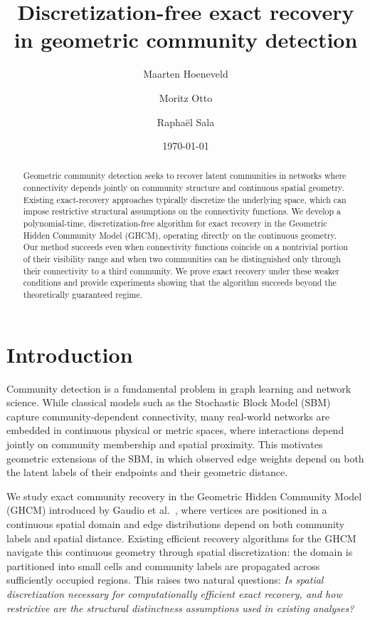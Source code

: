 \documentclass[11pt, a4paper]{amsart}
\title{Discretization-free exact recovery in geometric community detection}
\author{Maarten Hoeneveld}
\author{Moritz Otto}
\author{Raphaël Sala}
\date{\today}
\newcommand{\1}{\mathbf{1}}
\theoremstyle{definition}
\theoremstyle{remark}
\theoremstyle{definition}
\begin{document}
\begin{abstract}
Geometric community detection seeks to recover latent communities in networks where connectivity depends jointly on community structure and continuous spatial geometry. Existing exact-recovery approaches typically discretize the underlying space, which can impose restrictive structural assumptions on the connectivity functions. We develop a polynomial-time, discretization-free algorithm for exact recovery in the Geometric Hidden Community Model (GHCM), operating directly on the continuous geometry. Our method succeeds even when connectivity functions coincide on a nontrivial portion of their visibility range and when two communities can be distinguished only through their connectivity to a third community. We prove exact recovery under these weaker conditions and provide experiments showing that the algorithm succeeds beyond the theoretically guaranteed regime.
\end{abstract}

\maketitle


\section{Introduction}

Community detection is a fundamental problem in graph learning and network
science. While classical models such as the Stochastic Block Model (SBM)
capture community-dependent connectivity, many real-world networks are
embedded in continuous physical or metric spaces, where interactions depend
jointly on community membership and spatial proximity. This motivates
geometric extensions of the SBM, in which observed edge weights depend on
both the latent labels of their endpoints and their geometric distance.

We study exact community recovery in the Geometric Hidden Community Model
(GHCM) introduced by Gaudio et al.~\cite{gaudio2025incguan}, where vertices
are positioned in a continuous spatial domain and edge distributions depend
on both community labels and spatial distance. Existing efficient recovery
algorithms for the GHCM navigate this continuous geometry through spatial
discretization: the domain is partitioned into small cells and community
labels are propagated across sufficiently occupied regions. This raises two
natural questions: \emph{Is spatial discretization necessary for
computationally efficient exact recovery, and how restrictive are the
structural distinctness assumptions used in existing analyses?}
\end{document}
